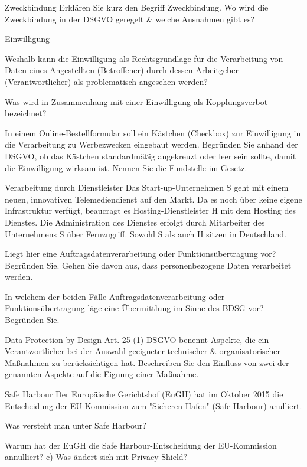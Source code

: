 \documentclass{exercisesheet}
\begin{document}
\begin{exercise}{Zweckbindung}
  Erklären Sie kurz den Begriff Zweckbindung. Wo wird die Zweckbindung in der DSGVO geregelt \& welche Ausnahmen gibt es?
\end{exercise}

\begin{exercises}{Einwilligung}
\item Weshalb kann die Einwilligung als Rechtsgrundlage für die Verarbeitung von Daten eines Angestellten (Betroffener) durch dessen Arbeitgeber (Verantwortlicher) als problematisch angesehen werden?
\item Was wird in Zusammenhang mit einer Einwilligung als Kopplungsverbot bezeichnet?
\item In einem Online-Bestellformular soll ein Kästchen (Checkbox) zur Einwilligung in die Verarbeitung zu Werbezwecken eingebaut werden. Begründen Sie anhand der DSGVO, ob das Kästchen standardmäßig angekreuzt oder leer sein sollte, damit die Einwilligung wirksam ist. Nennen Sie die Fundstelle im Gesetz.
\end{exercises}

\begin{eexercises}{Verarbeitung durch Dienstleister}{
    Das Start-up-Unternehmen S geht mit einem neuen, innovativen Telemediendienst auf den Markt. Da es noch über keine eigene Infrastruktur verfügt, beaucragt es Hosting-Dienstleister H mit dem Hosting des Dienstes. Die Administration des Dienstes erfolgt durch Mitarbeiter des Unternehmens S über Fernzugriff. Sowohl S als auch H sitzen in Deutschland.
  }
  \item Liegt hier eine Auftragsdatenverarbeitung oder Funktionsübertragung vor? Begründen Sie. Gehen Sie davon aus, dass personenbezogene Daten verarbeitet werden.
  \item In welchem der beiden Fälle Auftragsdatenverarbeitung oder Funktionsübertragung läge eine Übermittlung im Sinne des BDSG vor? Begründen Sie.
\end{eexercises}

\begin{exercise}{Data Protection by Design}
  Art. 25 (1) DSGVO benennt Aspekte, die ein Verantwortlicher bei der Auswahl geeigneter technischer \& organisatorischer Maßnahmen zu berücksichtigen hat. Beschreiben Sie den Einfluss von zwei der genannten Aspekte auf die Eignung einer Maßnahme.
\end{exercise}

\begin{eexercises}{Safe Harbour}{
    Der Europäische Gerichtshof (EuGH) hat im Oktober 2015 die Entscheidung der EU-Kommission zum "Sicheren Hafen" (Safe Harbour) anulliert.
  }
  \item Was versteht man unter Safe Harbour?
  \item Warum hat der EuGH die Safe Harbour-Entscheidung der EU-Kommission annulliert? c) Was ändert sich mit Privacy Shield?
\end{eexercises}
\end{document}
